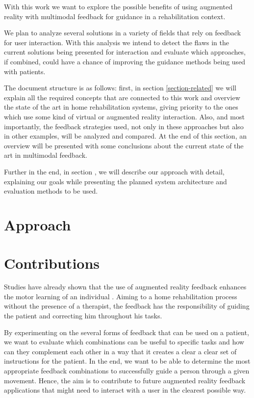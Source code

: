 With this work we want to explore the possible benefits of using augmented reality with multimodal 
feedback for guidance in a rehabilitation context.

We plan to analyze several solutions in a variety of fields that rely on feedback for user interaction.
With this analysis we intend to detect the flaws in the current solutions being presented for interaction 
and evaluate which approaches, if combined, could have a chance of improving 
the guidance methods being used with patients.


The document structure is as follows: first, in section \ref{section-related} we will 
explain all the required concepts that are connected to 
this work and overview the state of the art in home rehabilitation systems, giving priority to 
the ones which use some kind of virtual or augmented reality interaction. Also, and most importantly, the feedback strategies used,
not only in these approaches but also in other examples, will be analyzed and compared. 
At the end of this section, an overview will be presented with some conclusions about the current state of the art in multimodal feedback.

Further in the end, in section %
, we will describe our approach with detail, explaining our goals 
while presenting the planned system architecture and evaluation methods to be used.


\section{Approach}

\section{Contributions}


Studies have already shown that the use of augmented reality feedback enhances the motor learning of an individual \cite{Sigrist2013}.
Aiming to a home rehabilitation process without the presence of a therapist,
the feedback has the responsibility of guiding the patient and correcting him throughout his tasks.

By experimenting on the several forms of feedback that can be used on a patient, we want to evaluate which 
combinations can be useful to specific tasks and how can they complement each other 
in a way that it creates a clear a clear set of instructions for the patient. 
In the end, we want to be able to determine the most appropriate feedback combinations to successfully guide a person through a given movement.
Hence, the aim is to contribute to future augmented reality feedback applications that might need to interact with a user in the clearest possible way.

